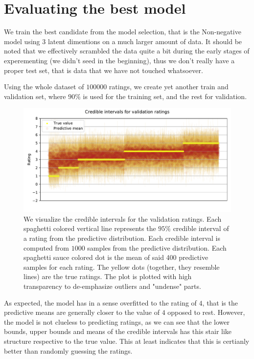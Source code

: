 \documentclass[12pt]{article}
\begin{document}
\section{Evaluating the best model}
We train the best candidate from the model selection, that is the Non-negative model using $3$ latent dimentions on a much larger amount of data. It should be noted that we effectively scrambled the data quite a bit during the early stages of experementing (we didn't seed in the beginning), thus we don't really have a proper test set, that is data that we have not touched whatsoever.

\vspace{5mm}
Using the whole dataset of $100000$ ratings, we create yet another train and validation set, where $90\%$ is used for the training set, and the rest for validation.

\begin{figure}[H]
    \centering
    \caption{We visualize the credible intervals for the validation ratings. Each spaghetti colored vertical line represents the $95\%$ credible interval of a rating from the predictive distribution. Each credible interval is computed from $1000$ samples from the predictive distribution. Each spaghetti sauce colored dot is the mean of said 400 predictive samples for each rating. The yellow dots (together, they resemble lines) are the true ratings. The plot is plotted with high transparency to de-emphasize outliers and "undense" parts.}
    \label{fig:credibles}
    \includegraphics[width=\textwidth]{credibles.pdf}
\end{figure}
As expected, the model has in a sense overfitted to the rating of $4$, that is the predictive means are generally closer to the value of $4$ opposed to rest. However, the model is not clueless to predicting ratings, as we can see that the lower bounds, upper bounds and means of the credible intervals has this stair like structure respective to the true value. This at least indicates that this is certianly better than randomly guessing the ratings.
\end{document}
